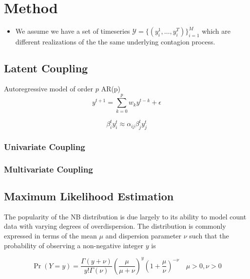\documentclass{article}
\newcommand{\Set}[1]{\mathcal{#1}}
\begin{document}
\section{Method}
\label{sec:org10c1259}
\begin{itemize}
\item We assume we have a set of timeseries \(\Set{Y} = \{(y_i^1, \ldots,
  y_i^T)\}_{i=1}^M\) which are different realizations of the the same underlying
contagion process.
\end{itemize}

\subsection{Latent Coupling}
\label{sec:org869a27e}
Autoregressive model of order \(p\) AR(p)
\begin{equation}
    y^{t+1} = \sum_{k=0}^p w_k y^{t-k} + \epsilon
\end{equation}

\begin{equation}
\beta_i^t y_i^t \approx \alpha_{ij }\beta_j^t y_j^t
\end{equation}

\subsubsection{Univariate Coupling}
\label{sec:orgd42cd60}

\subsubsection{Multivariate Coupling}
\label{sec:org61f2c7e}

\subsection{Maximum Likelihood Estimation}
\label{sec:org088c534}
The popularity of the NB distribution is due largely to its ability to model
count data with varying degrees of overdispersion. The distribution is commonly
expressed in terms of the mean \(\mu\) and dispersion parameter \(\nu\) such that the
probability of observing a non-negative integer \(y\) is

\begin{equation*}
\Pr(Y = y) = \frac{\Gamma(y + \nu)}{y!\Gamma(\nu)}\left(\frac{\mu}{\mu +\nu}\right)^{y}\left(1 + \frac{\mu}{\nu}\right)^{-\nu}
\quad \mu > 0, \nu > 0
\end{equation*}
\end{document}
